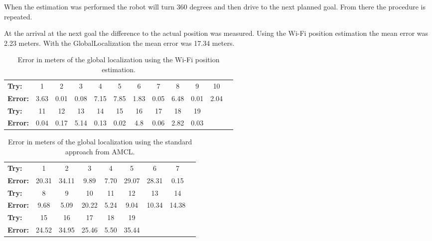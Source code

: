 When the estimation was performed the robot will turn 360 degrees and then drive to the next planned goal. From there the procedure is repeated. 

At the arrival at the next goal the difference to the actual position was measured. Using the Wi-Fi position estimation the mean error was 2.23 meters. With the \gls{GlobalLocalization} the mean error was 17.34 meters. 

\begin{table} \label{table:exp2wpe}
\centering
\caption{Error in meters of the global localization using the Wi-Fi position estimation.}
\begin{tabular}{l*{10}{c}r}
  \hline			
  \bf Try: & 1 & 2 & 3 & 4 & 5 & 6 & 7 & 8 & 9 & 10 \\
  \bf Error: & 3.63 & 0.01 & 0.08 & 7.15 & 7.85 & 1.83 & 0.05 & 6.48 & 0.01 & 2.04 \\
  \hline  
    \bf Try: & 11 & 12 & 13 & 14 & 15 & 16 & 17 & 18 & 19 \\
    \bf Error: & 0.04 & 0.17 & 5.14 & 0.13 & 0.02 & 4.8 & 0.06 & 2.82 & 0.03 \\
    \hline  
\end{tabular}
\end{table}

\begin{table} \label{table:exp2gl}
\centering
\caption{Error in meters of the global localization using the standard approach from AMCL.}
\begin{tabular}{l*{7}{c}r}
  \hline			
  \bf Try: & 1 & 2 & 3 & 4 & 5 & 6 & 7 \\
  \bf Error: & 20.31 & 34.11 & 9.89 & 7.70 & 29.07 & 28.31 & 0.15 \\  
    \hline			
    \bf Try: & 8 & 9 & 10 & 11 & 12 & 13 & 14 \\
    \bf Error: & 9.68 & 5.09 & 20.22 & 5.24 & 9.04 & 10.34 & 14.38 \\
        \hline			
        \bf Try: & 15 & 16 & 17 & 18 & 19 \\
        \bf Error: & 24.52 & 34.95 & 25.46 & 5.50 & 35.44 \\
        \hline  
\end{tabular}
\end{table}


